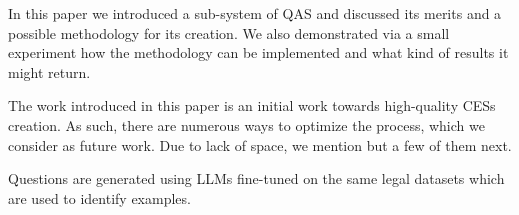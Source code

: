In this paper we introduced a sub-system of QAS and discussed its merits and a possible methodology for its creation. We also demonstrated via a small experiment how the methodology can be implemented and what kind of results it might return.

The work introduced in this paper is an initial work towards high-quality CESs creation. As such, there are numerous ways to optimize the process, which we consider as future work. Due to lack of space, we mention but a few of them next.

Questions are generated using LLMs fine-tuned on the same legal datasets which are used to identify examples.